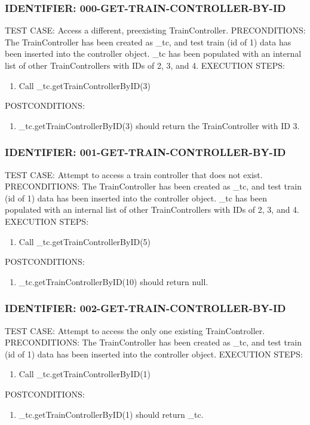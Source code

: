 \documentclass{scrreprt}
\begin{document}
\subsubsection{IDENTIFIER: 000-GET-TRAIN-CONTROLLER-BY-ID}
TEST CASE: Access a different, preexisting TrainController.
PRECONDITIONS: The TrainController has been created as _tc, and test train (id of 1) data has been inserted into the controller object. _tc has been populated with an internal list of other TrainControllers with IDs of 2, 3, and 4.
EXECUTION STEPS:
\begin{enumerate}
	\item Call _tc.getTrainControllerByID(3)
\end{enumerate}
POSTCONDITIONS:
\begin{enumerate}
	\item _tc.getTrainControllerByID(3) should return the TrainController with ID 3.
\end{enumerate}

\subsubsection{IDENTIFIER: 001-GET-TRAIN-CONTROLLER-BY-ID}
TEST CASE: Attempt to access a train controller that does not exist.
PRECONDITIONS: The TrainController has been created as _tc, and test train (id of 1) data has been inserted into the controller object. _tc has been populated with an internal list of other TrainControllers with IDs of 2, 3, and 4.
EXECUTION STEPS:
\begin{enumerate}
	\item Call _tc.getTrainControllerByID(5)
\end{enumerate}
POSTCONDITIONS:
\begin{enumerate}
	\item _tc.getTrainControllerByID(10) should return null.
\end{enumerate}

\subsubsection{IDENTIFIER: 002-GET-TRAIN-CONTROLLER-BY-ID}
TEST CASE: Attempt to access the only one existing TrainController.
PRECONDITIONS: The TrainController has been created as _tc, and test train (id of 1) data has been inserted into the controller object.
EXECUTION STEPS:
\begin{enumerate}
	\item Call _tc.getTrainControllerByID(1)
\end{enumerate}
POSTCONDITIONS:
\begin{enumerate}
	\item _tc.getTrainControllerByID(1) should return _tc.
\end{enumerate}
\end{document}
